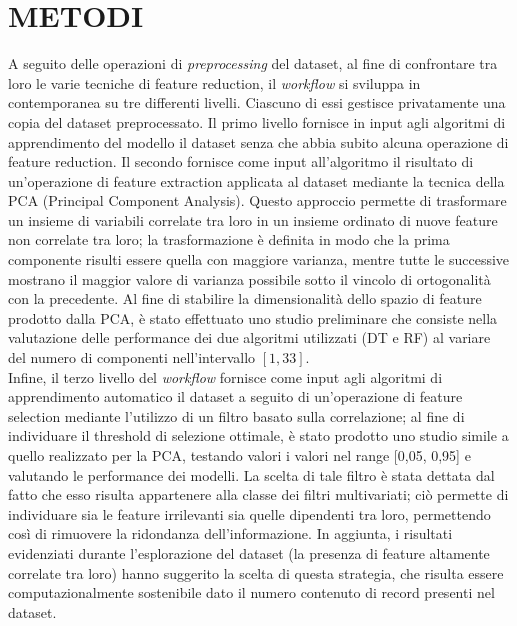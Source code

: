 \section{METODI}
A seguito delle operazioni di \textit{preprocessing} del dataset, al fine di confrontare tra loro le varie tecniche di feature reduction, il \textit{workflow} si sviluppa in contemporanea su tre differenti livelli.
Ciascuno di essi gestisce privatamente una copia del dataset preprocessato.
Il primo livello fornisce in input agli algoritmi di apprendimento del modello il dataset senza che abbia subito alcuna operazione di feature reduction.
Il secondo fornisce come input all'algoritmo il risultato di un'operazione di feature extraction applicata al dataset mediante la tecnica della PCA (Principal Component Analysis). Questo approccio permette di trasformare un insieme di variabili correlate tra loro in un insieme ordinato di nuove feature non correlate tra loro; la trasformazione è definita in modo che la prima componente risulti essere quella con maggiore varianza, mentre tutte le successive mostrano il maggior valore di varianza possibile sotto il vincolo di ortogonalità con la precedente.
Al fine di stabilire la dimensionalità dello spazio di feature prodotto dalla PCA, è stato effettuato uno studio preliminare che consiste nella valutazione delle performance dei due algoritmi utilizzati (DT e RF)  al variare del numero di componenti nell'intervallo $[1, 33]$.\\
Infine, il terzo livello del \textit{workflow} fornisce come input agli algoritmi di apprendimento automatico il dataset a seguito di un'operazione di feature selection mediante l'utilizzo di un filtro basato sulla correlazione; al fine di individuare il threshold di selezione ottimale, è stato prodotto uno studio simile a quello realizzato per la PCA, testando valori i valori nel range [0,05, 0,95] e valutando le performance dei modelli.
La scelta di tale filtro è stata dettata dal fatto che esso risulta appartenere alla classe dei filtri multivariati; ciò permette di individuare sia le feature irrilevanti sia quelle dipendenti tra loro, permettendo così di rimuovere la ridondanza dell'informazione. 
In aggiunta, i risultati evidenziati durante l'esplorazione del dataset (la presenza di feature altamente correlate tra loro) hanno suggerito la scelta di questa strategia, che risulta essere computazionalmente sostenibile dato il numero contenuto di record presenti nel dataset.

